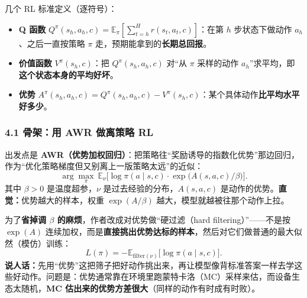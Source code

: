 \documentclass[11pt,UTF8,fontset=fandol]{ctexart}
\begin{document}
几个 RL 标准定义（逐符号）：
\begin{itemize}[leftmargin=1.4em]
\item \textbf{Q 函数} $Q^\pi(s_h,a_h,c)=\mathbb{E}_\pi\!\left[\sum_{t=h}^{H} r(s_t,a_t,c)\right]$：在第 $h$ 步状态下做动作 $a_h$、之后一直按策略 $\pi$ 走，预期能拿到的\textbf{长期总回报}。
\item \textbf{价值函数} $V^\pi(s_h,c)$：把 $Q^\pi(s_h,a_h,c)$ 对“从 $\pi$ 采样的动作 $a_h$”求平均，即\textbf{这个状态本身的平均好坏}。
\item \textbf{优势} $A^\pi(s_h,a_h,c)=Q^\pi(s_h,a_h,c)-V^\pi(s_h,c)$：某个具体动作\textbf{比平均水平好多少}。
\end{itemize}

\subsubsection*{4.1 骨架：用 AWR 做离策略 RL}
出发点是 \textbf{AWR（优势加权回归）}：把策略往“奖励诱导的指数化优势”那边回归，作为“优化策略梯度但又别离上一版策略太远”的近似：
\[
\arg\max_\pi\ \mathbb{E}_\nu\big[\log \pi(a\mid s,c)\cdot \exp\big(A(s,a,c)/\beta\big)\big]. \tag{4.1}
\]
其中 $\beta>0$ 是温度超参，$\nu$ 是过去经验的分布，$A(s,a,c)$ 是动作的优势。\textbf{直觉：}优势越大的样本，权重 $\exp(A/\beta)$ 越大，模型就越被往那个动作上拉。

为了\textbf{省掉调 $\beta$ 的麻烦}，作者改成对优势做“硬过滤（hard filtering）”——不是按 $\exp(A)$ 连续加权，而是\textbf{直接挑出优势达标的样本}，然后对它们做普通的最大似然（模仿）训练：
\[
L(\pi)=-\mathbb{E}_{\mathrm{filter}(\nu)}\big[\log \pi(a\mid s,c)\big]. \tag{4.2}
\]
\textbf{说人话：}先用“优势”这把筛子把好动作挑出来，再让模型像背标准答案一样去学这些好动作。问题是：优势通常靠在环境里跑蒙特卡洛（MC）采样来估，而设备生态太随机，\textbf{MC 估出来的优势方差很大}（同样的动作有时成有时败）。
\end{document}
